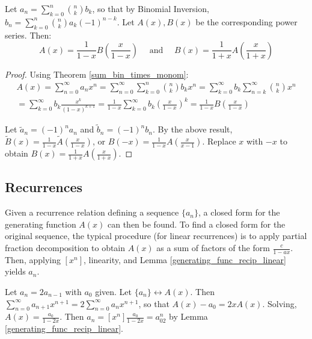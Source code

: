 \documentclass[a4paper]{article}
\begin{document}
\begin{theorem}
Let $a_n=\sum_{k=0}^n\binom nkb_k$, so that by Binomial Inversion, $b_n=\sum_{k=0}^n\binom nka_k(-1)^{n-k}$. Let $A(x),B(x)$ be the corresponding power series. Then:
\begin{equation*}
A(x)=\frac1{1-x}B\left(\frac x{1-x}\right)\quad\text{ and }\quad B(x)=\frac1{1+x}A\left(\frac x{1+x}\right)
\end{equation*}

\begin{hl}
\begin{proof}
Using Theorem \ref{sum_bin_times_monom}:
\begin{multline*}
A(x)
=\sum_{n=0}^\infty a_nx^n
=\sum_{n=0}^\infty\sum_{k=0}^n\binom nkb_kx^n
=\sum_{k=0}^\infty b_k\sum_{n=k}^\infty\binom nkx^n\\
=\sum_{k=0}^\infty b_k\frac{x^k}{(1-x)^{k+1}}
=\frac1{1-x}\sum_{k=0}^\infty b_k\left(\frac{x}{1-x}\right)^k
=\frac1{1-x}B\left(\frac{x}{1-x}\right)
\end{multline*}

Let $\widetilde a_n=(-1)^na_n$ and $\widetilde b_n=(-1)^nb_n$. By the above result, $\widetilde B(x)=\frac1{1-x}\widetilde A\left(\frac x{1-x}\right)$, or $B(-x)=\frac1{1-x}A\left(\frac x{x-1}\right)$. Replace $x$ with $-x$ to obtain $B(x)=\frac1{1+x}A\left(\frac{x}{1+x}\right)$.
\end{proof}
\end{hl}
\end{theorem}

\subsection{Recurrences}

\begin{concept}
Given a recurrence relation defining a sequence $\{a_n\}$, a closed form for the generating function $A(x)$ can then be found. To find a closed form for the original sequence, the typical procedure (for linear recurrences) is to apply partial fraction decomposition to obtain $A(x)$ as a sum of factors of the form $\frac{c}{1-ax}$. Then, applying $[x^n]$, linearity, and Lemma \ref{generating_func_recip_linear} yields $a_n$.
\end{concept}

\begin{example}
Let $a_n=2a_{n-1}$ with $a_0$ given. Let $\{a_n\}\longleftrightarrow A(x)$. Then $\sum_{n=0}^\infty a_{n+1}x^{n+1}=2\sum_{n=0}^\infty a_nx^{n+1}$, so that $A(x)-a_0=2xA(x)$. Solving, $A(x)=\frac{a_0}{1-2x}$. Then $a_n=[x^n]\frac{a_0}{1-2x}=a_02^n$ by Lemma \ref{generating_func_recip_linear}.
\end{example}
\end{document}
